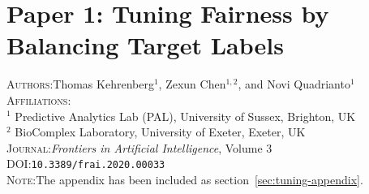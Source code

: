 \chapter{Paper 1: Tuning Fairness by Balancing Target Labels}\label{ch:paper1}

% 

% 






% 

\textsc{Authors}:\;\;Thomas Kehrenberg$^1$, Zexun Chen$^{1,2}$, and Novi Quadrianto$^1$ \\
\textsc{Affiliations}:\\
$^1$ Predictive Analytics Lab (PAL), University of Sussex, Brighton, UK\\
$^2$ BioComplex Laboratory, University of Exeter, Exeter, UK \\
\textsc{Journal}:\;\;\textit{Frontiers in Artificial Intelligence}, Volume 3 \\
\textsc{DOI}:\;\;\texttt{10.3389/frai.2020.00033} \\
\textsc{Note}:\;\;The appendix has been included as section~\ref{sec:tuning-appendix}.

